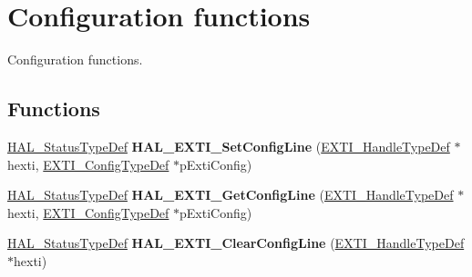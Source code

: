 \hypertarget{group___e_x_t_i___exported___functions___group1}{}\section{Configuration functions}
\label{group___e_x_t_i___exported___functions___group1}


Configuration functions.  


\subsection*{Functions}
\begin{DoxyCompactItemize}
\item 
\mbox{\label{group___e_x_t_i___exported___functions___group1_ga21c31dc6d13f1e32b4352e00ab6ad2b3}} 
\hyperlink{stm32f4xx__hal__def_8h_a63c0679d1cb8b8c684fbb0632743478f}{H\+A\+L\+\_\+\+Status\+Type\+Def} {\bfseries H\+A\+L\+\_\+\+E\+X\+T\+I\+\_\+\+Set\+Config\+Line} (\hyperlink{struct_e_x_t_i___handle_type_def}{E\+X\+T\+I\+\_\+\+Handle\+Type\+Def} $\ast$hexti, \hyperlink{struct_e_x_t_i___config_type_def}{E\+X\+T\+I\+\_\+\+Config\+Type\+Def} $\ast$p\+Exti\+Config)
\item 
\mbox{\label{group___e_x_t_i___exported___functions___group1_gabc6617165a2712df438f38509c8205dd}} 
\hyperlink{stm32f4xx__hal__def_8h_a63c0679d1cb8b8c684fbb0632743478f}{H\+A\+L\+\_\+\+Status\+Type\+Def} {\bfseries H\+A\+L\+\_\+\+E\+X\+T\+I\+\_\+\+Get\+Config\+Line} (\hyperlink{struct_e_x_t_i___handle_type_def}{E\+X\+T\+I\+\_\+\+Handle\+Type\+Def} $\ast$hexti, \hyperlink{struct_e_x_t_i___config_type_def}{E\+X\+T\+I\+\_\+\+Config\+Type\+Def} $\ast$p\+Exti\+Config)
\item 
\mbox{\label{group___e_x_t_i___exported___functions___group1_gae8ed1defdcf965a62618af09c45c7866}} 
\hyperlink{stm32f4xx__hal__def_8h_a63c0679d1cb8b8c684fbb0632743478f}{H\+A\+L\+\_\+\+Status\+Type\+Def} {\bfseries H\+A\+L\+\_\+\+E\+X\+T\+I\+\_\+\+Clear\+Config\+Line} (\hyperlink{struct_e_x_t_i___handle_type_def}{E\+X\+T\+I\+\_\+\+Handle\+Type\+Def} $\ast$hexti)
\item 
\mbox{\label{group___e_x_t_i___exported___functions___group1_gacb6ee7e9f2429c3c3a1c99d4fe2d26d7}} 

\end{DoxyCompactItemize}
